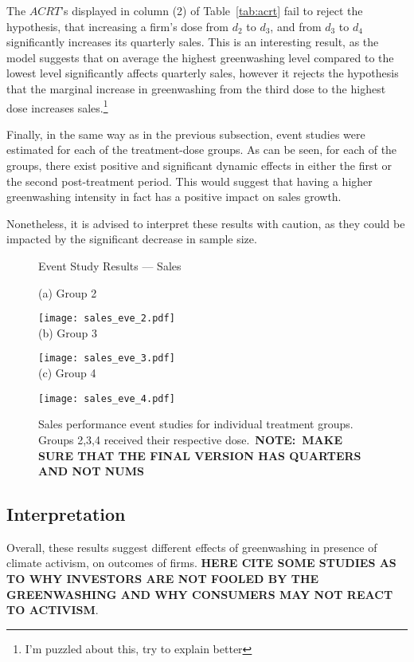 \documentclass[12pt]{article}
\begin{document}
The $ACRT$'s displayed in column (2) of Table~\ref{tab:acrt} fail to reject the hypothesis, that increasing a firm's dose from $d_2$ to $d_3$, and from $d_3$ to $d_4$ significantly increases its quarterly sales. This is an interesting result, as the model suggests that on average the highest greenwashing level compared to the lowest level significantly affects quarterly sales, however it rejects the hypothesis that the marginal increase in greenwashing from the third dose to the highest dose increases sales.\footnote{I'm puzzled about this, try to explain better}

Finally, in the same way as in the previous subsection, event studies were estimated for each of the treatment-dose groups. As can be seen, for each of the groups, there exist positive and significant dynamic effects in either the first or the second post-treatment period. This would suggest that having a higher greenwashing intensity in fact has a positive impact on sales growth.

Nonetheless, it is advised to interpret these results with caution, as they could be impacted by the significant decrease in sample size. 

\begin{figure}
    \caption{Event Study Results --- Sales}
    \centering
    
    (a) Group 2
    
    \texttt{[image: sales\_eve\_2.pdf]} \\
    
    (b) Group 3
    
    \texttt{[image: sales\_eve\_3.pdf]} \\
    
    (c) Group 4
    
    \texttt{[image: sales\_eve\_4.pdf]}
    
    \captionsetup{font=footnotesize}
    \caption*{Sales performance event studies for individual treatment groups. Groups 2,3,4 received their respective dose.\ \textbf{NOTE:~MAKE SURE THAT THE FINAL VERSION HAS QUARTERS AND NOT NUMS}}
\end{figure}

\subsection{Interpretation}

Overall, these results suggest different effects of greenwashing in presence of climate activism, on outcomes of firms. \textbf{HERE CITE SOME STUDIES AS TO WHY INVESTORS ARE NOT FOOLED BY THE GREENWASHING AND WHY CONSUMERS MAY NOT REACT TO ACTIVISM}.
\end{document}
